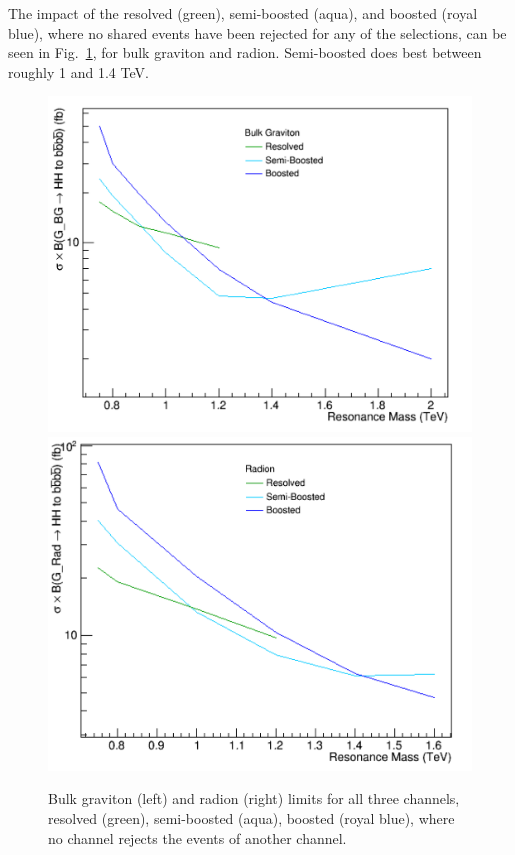 The impact of the resolved (green), semi-boosted (aqua), and boosted (royal blue), where no shared events have been rejected for any of the selections, can be seen in Fig.~\ref{fig:limcompare}, for bulk graviton and radion. Semi-boosted does best between roughly 1 and 1.4 TeV.
\begin{figure}
\centering
\includegraphics[scale=0.35]{F5/bg_compare.pdf}
\includegraphics[scale=0.35]{F5/radion_compare.pdf}
\caption{Bulk graviton (left) and radion (right) limits for all three channels, resolved (green), semi-boosted (aqua), boosted (royal blue), where no channel rejects the events of another channel.}
\label{fig:limcompare}
\end{figure}


